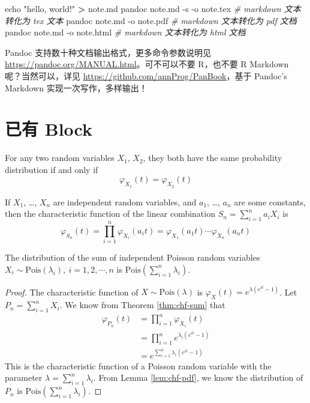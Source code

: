 \documentclass[
  lang=cn,
  11pt,
  scheme=chinese,
  chinesefont=nofont,
  bibstyle=apalike]{elegantbook}
\newenvironment{Shaded}{\begin{snugshade}}{\end{snugshade}}
\newcommand{\BuiltInTok}[1]{#1}
\newcommand{\CommentTok}[1]{\textcolor[rgb]{0.56,0.35,0.01}{\textit{#1}}}
\newcommand{\ExtensionTok}[1]{#1}
\newcommand{\NormalTok}[1]{#1}
\newcommand{\OperatorTok}[1]{\textcolor[rgb]{0.81,0.36,0.00}{\textbf{#1}}}
\newcommand{\StringTok}[1]{\textcolor[rgb]{0.31,0.60,0.02}{#1}}
\let\BeginKnitrBlock\begin \let\EndKnitrBlock\end
\begin{document}
\begin{Shaded}
\begin{Highlighting}[]
\BuiltInTok{echo} \StringTok{"hello, world!"} \OperatorTok{\textgreater{}}\NormalTok{ note.md}
\ExtensionTok{pandoc}\NormalTok{ note.md {-}s {-}o note.tex }\CommentTok{\# markdown 文本转化为 tex 文本}
\ExtensionTok{pandoc}\NormalTok{ note.md {-}o note.pdf    }\CommentTok{\# markdown 文本转化为 pdf 文档}
\ExtensionTok{pandoc}\NormalTok{ note.md {-}o note.html   }\CommentTok{\# markdown 文本转化为 html 文档}
\end{Highlighting}
\end{Shaded}

Pandoc 支持数十种文档输出格式，更多命令参数说明见 \url{https://pandoc.org/MANUAL.html}。可不可以不要 R，也不要 R Markdown 呢？当然可以，详见 \url{https://github.com/annProg/PanBook}，基于 Pandoc's Markdown 实现一次写作，多样输出！

\hypertarget{theorem-block}{%
\section{已有 Block}\label{theorem-block}}

\BeginKnitrBlock{lemma}{}{}
\protect\hypertarget{lem:chf-pdf}{}{\label{lem:chf-pdf} }For any two random variables \(X_1\), \(X_2\), they both have the same probability distribution if and only if \[\varphi _{X_1}(t)=\varphi _{X_2}(t)\]
\EndKnitrBlock{lemma}

\BeginKnitrBlock{theorem}{}{}
\protect\hypertarget{thm:chf-sum}{}{\label{thm:chf-sum} }If \(X_1\), \ldots, \(X_n\) are independent random variables, and \(a_1\), \ldots, \(a_n\) are some constants, then the characteristic function of the linear combination \(S_n=\sum_{i=1}^na_iX_i\) is \[\varphi _{S_{n}}(t)=\prod_{i=1}^n\varphi _{X_i}(a_{i}t)=\varphi _{X_{1}}(a_{1}t)\cdots \varphi _{X_{n}}(a_{n}t)\]
\EndKnitrBlock{theorem}

\BeginKnitrBlock{proposition}{}{}
\protect\hypertarget{prp:unnamed-chunk-5}{}{\label{prp:unnamed-chunk-5} }The distribution of the sum of independent Poisson random variables \(X_i \sim \mathrm{Pois}(\lambda_i),\: i=1,2,\cdots,n\) is \(\mathrm{Pois}(\sum_{i=1}^n\lambda_i)\).
\EndKnitrBlock{proposition}

\BeginKnitrBlock{proof}
\iffalse{} {证明 } \fi{}The characteristic function of \(X\sim\mathrm{Pois}(\lambda)\) is \(\varphi _{X}(t)=e^{\lambda (e^{it}-1)}\). Let \(P_n=\sum_{i=1}^nX_i\). We know from Theorem \ref{thm:chf-sum} that \begin{equation*}
\begin{split}
\varphi _{P_{n}}(t) & =\prod_{i=1}^n\varphi _{X_i}(t) \\
& =\prod_{i=1}^n e^{\lambda_i (e^{it}-1)} \\
& = e^{\sum_{i=1}^n \lambda_i (e^{it}-1)}
\end{split}
\end{equation*} This is the characteristic function of a Poisson random variable with the parameter \(\lambda=\sum_{i=1}^n \lambda_i\). From Lemma \ref{lem:chf-pdf}, we know the distribution of \(P_n\) is \(\mathrm{Pois}(\sum_{i=1}^n\lambda_i)\).
\EndKnitrBlock{proof}
\end{document}
